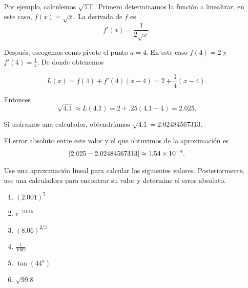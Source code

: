     Por ejemplo, calculemos $\sqrt{4.1}.$ Primero determinamos la función a linealizar, en este caso, $f(x)=\sqrt{x}.$ La
    derivada de $f$ es
    $$
    f'(x)=\dfrac{1}{2\sqrt{x}}.
    $$



    Después, escogemos como pivote el punto $a=4.$ En este caso $f(4)=2$ y $f'(4)=\frac{1}{4}.$ De donde obtenemos

    $$
    L(x)=f(4)+f'(4)(x-4)=2+\frac{1}{4}(x-4).
    $$



    Entonces
    $$
    \sqrt{4.1}\approx L(4.1) =2+.25(4.1-4)=2.025.
    $$



    Si usáramos una calculador, obtendríamos $\sqrt{4.1}=2.02484567313.$



    El error absoluto entre este valor y el que
    obtuvimos de la aproximación es
    $$
    \left|2.025-2.02484567313\right|\approx 1.54 \times 10^{-4}.
    $$





    \begin{resuelto}
        Use una aproximación lineal para calcular los siguientes valores. Posteriormente, use una calculadora para encontrar
        su valor y determine el error absoluto.
        \begin{enumerate}
            \item $(2.001)^{5}$
            \item $e^{-0.015}$
            \item $(8.06)^{2/3}$
            \item $\frac{1}{1002}$
            \item $\tan(44^{o})$
            \item $\sqrt{99.8}$
        \end{enumerate}

    \end{resuelto}

